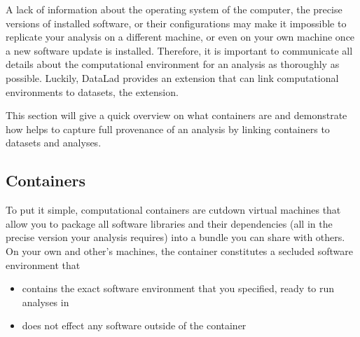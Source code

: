 \sphinxAtStartPar
A lack of information about the operating system of the computer, the precise
versions of installed software, or their configurations may
make it impossible to replicate your analysis on a different machine, or even
on your own machine once a new software update is installed. Therefore, it is
important to communicate all details about the computational environment for
an analysis as thoroughly as possible. Luckily, DataLad provides an extension
that can link computational environments to datasets, the
extension.

\sphinxAtStartPar
This section will give a quick overview on what containers are and
demonstrate how  helps to capture full provenance of an
analysis by linking containers to datasets and analyses.

\ignorespaces 

\subsection{Containers}
\label{\detokenize{basics/101-133-containersrun:containers}}\label{\detokenize{basics/101-133-containersrun:index-0}}
\sphinxAtStartPar
To put it simple, computational containers are cut\sphinxhyphen{}down virtual machines that
allow you to package all software libraries and their dependencies (all in the
precise version your analysis requires) into a bundle you can share with
others. On your own and other’s machines, the container constitutes a secluded
software environment that
\begin{itemize}
\item {} 
\sphinxAtStartPar
contains the exact software environment that you specified, ready to run
analyses in

\item {} 
\sphinxAtStartPar
does not effect any software outside of the container

\end{itemize}

